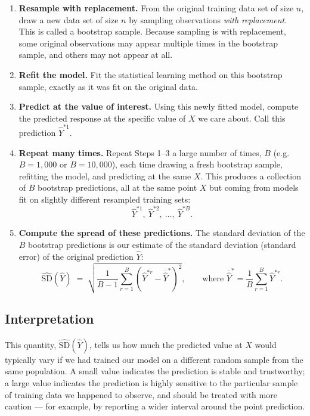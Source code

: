 \documentclass[11pt]{article}
\begin{document}
\begin{enumerate}[label=\textbf{Step \arabic*.}, leftmargin=1.6cm]

\item \textbf{Resample with replacement.} From the original training data set of size $n$, draw a new data set of size $n$ by sampling observations \emph{with replacement}. This is called a bootstrap sample. Because sampling is with replacement, some original observations may appear multiple times in the bootstrap sample, and others may not appear at all.

\item \textbf{Refit the model.} Fit the statistical learning method on this bootstrap sample, exactly as it was fit on the original data.

\item \textbf{Predict at the value of interest.} Using this newly fitted model, compute the predicted response at the specific value of $X$ we care about. Call this prediction $\hat{Y}^{*1}$.

\item \textbf{Repeat many times.} Repeat Steps 1--3 a large number of times, $B$ (e.g.\ $B = 1{,}000$ or $B = 10{,}000$), each time drawing a fresh bootstrap sample, refitting the model, and predicting at the same $X$. This produces a collection of $B$ bootstrap predictions, all at the same point $X$ but coming from models fit on slightly different resampled training sets:
\[
\hat{Y}^{*1}, \ \hat{Y}^{*2}, \ \ldots, \ \hat{Y}^{*B}.
\]

\item \textbf{Compute the spread of these predictions.} The standard deviation of the $B$ bootstrap predictions is our estimate of the standard deviation (standard error) of the original prediction $\hat{Y}$:
\[
\widehat{\mathrm{SD}}(\hat{Y}) \;=\; \sqrt{\dfrac{1}{B-1}\sum_{r=1}^{B}\left(\hat{Y}^{*r} - \overline{\hat{Y}}^{*}\right)^{2}},
\qquad \text{where } \overline{\hat{Y}}^{*} = \dfrac{1}{B}\sum_{r=1}^{B}\hat{Y}^{*r}.
\]

\end{enumerate}

\subsection*{Interpretation}

This quantity, $\widehat{\mathrm{SD}}(\hat{Y})$, tells us how much the predicted value at $X$ would typically vary if we had trained our model on a different random sample from the same population. A small value indicates the prediction is stable and trustworthy; a large value indicates the prediction is highly sensitive to the particular sample of training data we happened to observe, and should be treated with more caution --- for example, by reporting a wider interval around the point prediction.
\end{document}
